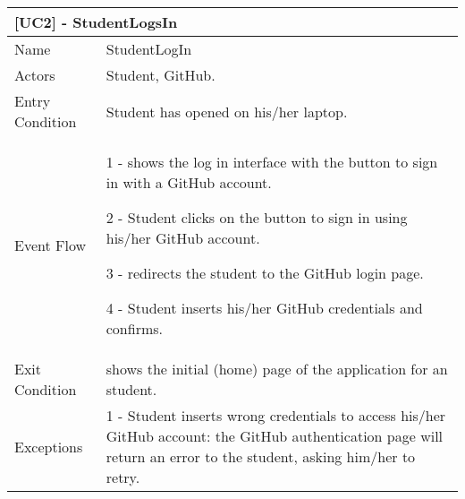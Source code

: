 	\begin{longtable}{|p{3cm}p{14cm}|}
		\multicolumn{2}{l}{\textbf{[UC2] - StudentLogsIn}}\\
		\hline
		Name & StudentLogIn \\
		\hline
		Actors & Student, GitHub. \\
		\hline
		Entry Condition & Student has opened \app on his/her laptop. \\
		\hline
		Event Flow &  
		
		1 - \app shows the log in interface with the button to sign in with a GitHub account.
		
		2 - Student clicks on the button to sign in using his/her GitHub account.
		
		3 - \app redirects the student to the GitHub login page.
		
		4 - Student inserts his/her GitHub credentials and confirms.
		\\
		\hline
		Exit Condition & \app shows the initial (home) page of the application for an student.  \\
		\hline
		Exceptions & 
		1 - Student inserts wrong credentials to access his/her GitHub account: the GitHub authentication page will return an error to the student, asking him/her to retry.\\
		\hline
    
    \end{longtable}
    
